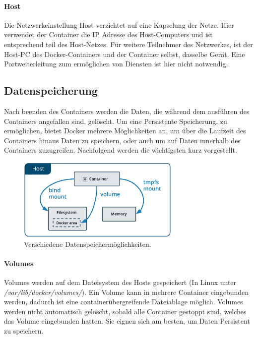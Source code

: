 			\paragraph{Host}
				Die Netzwerkeinstellung Host verzichtet auf eine Kapselung der Netze.
				Hier verwendet der Container die IP Adresse des Host-Computers und ist entsprechend teil des Host-Netzes.
				Für weitere Teilnehmer des Netzwerkes, ist der Host-PC des Docker-Containers und der Container selbst, dasselbe Gerät.
				Eine Portweiterleitung zum ermöglichen von Diensten ist hier nicht notwendig.
				
			\subsection{Datenspeicherung}
			\label{Grundlagen:Docker:Datenspeicherung}
				Nach beenden des Containers werden die Daten, die während dem ausführen des Containers angefallen sind, gelöscht.
				Um eine Persistente Speicherung, zu ermöglichen, bietet Docker mehrere Möglichkeiten an, um über die Laufzeit des Containers hinaus Daten zu speichern, oder auch um auf Daten innerhalb des Containers zuzugreifen. 
				Nachfolgend werden die wichtigsten kurz vorgestellt.
				
				\begin{figure}[H]
					\centering
					\includegraphics[width=0.70\textwidth]{"Bilder/DockerSpeichertypenpng.png"}
					\caption{Verschiedene Datenspeichermöglichkeiten. \cite{dockerStorage}}
					\label{fig:Grundlagen:Docker:Datenspeicherung}					
				\end{figure}
										
				\paragraph{Volumes}
					Volumes werden auf dem Dateisystem des Hosts gespeichert (In Linux unter \textit{/var/lib/docker/volumes/}).
					Ein Volume kann in mehrere Container eingebunden werden, dadurch ist eine containerübergreifende Dateiablage möglich.
					Volumes werden nicht automatisch gelöscht, sobald alle Container gestoppt sind, welches das Volume eingebunden hatten.
					Sie eignen sich am besten, um Daten Persistent zu speichern. \cite{dockerStorage}
				
